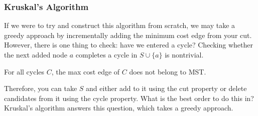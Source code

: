 \documentclass{article}
\begin{document}
    \subsubsection{Kruskal's Algorithm}

      If we were to try and construct this algorithm from scratch, we may take a greedy approach by incrementally adding the minimum cost edge from your cut. However, there is one thing to check: have we entered a cycle? Checking whether the next added node $a$ completes a cycle in $S \cup \{a\}$ is nontrivial. 

      \begin{theorem}
        For all cycles $C$, the max cost edge of $C$ does not belong to MST. 
      \end{theorem}

      Therefore, you can take $S$ and either add to it using the cut property or delete candidates from it using the cycle property. What is the best order to do this in? Kruskal's algorithm answers this question, which takes a greedy approach. 
\end{document}
